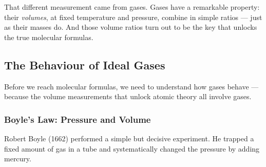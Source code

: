 \documentclass[12pt, a4paper]{book}
\theoremstyle{definition}
\begin{document}
That different measurement came from gases.
Gases have a remarkable property:
their \emph{volumes}, at fixed temperature and pressure,
combine in simple ratios --- just as their masses do.
And those volume ratios turn out to be the key that unlocks
the true molecular formulas.

\subsection{The Behaviour of Ideal Gases}

Before we reach molecular formulas, we need to understand
how gases behave --- because the volume measurements
that unlock atomic theory all involve gases.

\subsubsection{Boyle's Law: Pressure and Volume}

Robert Boyle (1662) performed a simple but decisive experiment.
He trapped a fixed amount of gas in a tube
and systematically changed the pressure by adding mercury.
\end{document}
